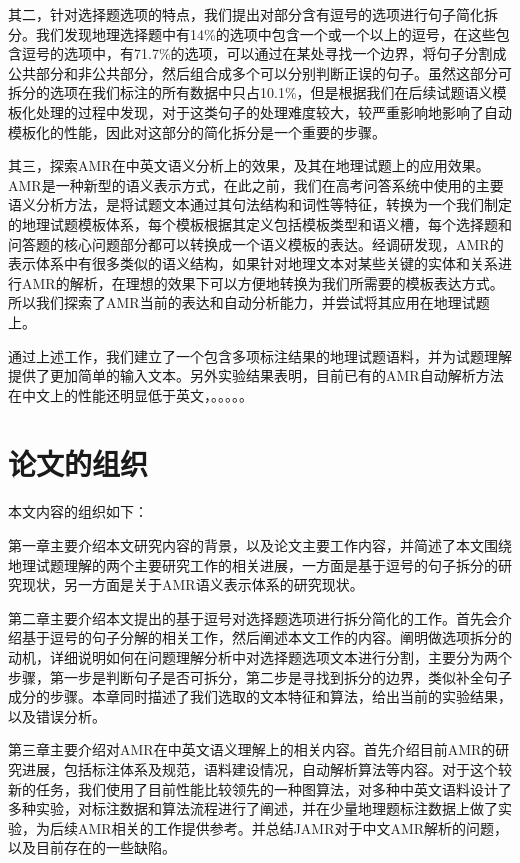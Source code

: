 \documentclass[master, winfont]{njuthesis}
\begin{document}
其二，针对选择题选项的特点，我们提出对部分含有逗号的选项进行句子简化拆分。我们发现地理选择题中有14\%的选项中包含一个或一个以上的逗号，在这些包含逗号的选项中，有71.7\%的选项，可以通过在某处寻找一个边界，将句子分割成公共部分和非公共部分，然后组合成多个可以分别判断正误的句子。虽然这部分可拆分的选项在我们标注的所有数据中只占10.1\%，但是根据我们在后续试题语义模板化处理的过程中发现，对于这类句子的处理难度较大，较严重影响地影响了自动模板化的性能，因此对这部分的简化拆分是一个重要的步骤。

其三，探索AMR在中英文语义分析上的效果，及其在地理试题上的应用效果。AMR是一种新型的语义表示方式，在此之前，我们在高考问答系统中使用的主要语义分析方法，是将试题文本通过其句法结构和词性等特征，转换为一个我们制定的地理试题模板体系，每个模板根据其定义包括模板类型和语义槽，每个选择题和问答题的核心问题部分都可以转换成一个语义模板的表达。经调研发现，AMR的表示体系中有很多类似的语义结构，如果针对地理文本对某些关键的实体和关系进行AMR的解析，在理想的效果下可以方便地转换为我们所需要的模板表达方式。所以我们探索了AMR当前的表达和自动分析能力，并尝试将其应用在地理试题上。

通过上述工作，我们建立了一个包含多项标注结果的地理试题语料，并为试题理解提供了更加简单的输入文本。另外实验结果表明，目前已有的AMR自动解析方法在中文上的性能还明显低于英文，。。。。。

\section{论文的组织}
本文内容的组织如下：

第一章主要介绍本文研究内容的背景，以及论文主要工作内容，并简述了本文围绕地理试题理解的两个主要研究工作的相关进展，一方面是基于逗号的句子拆分的研究现状，另一方面是关于AMR语义表示体系的研究现状。

第二章主要介绍本文提出的基于逗号对选择题选项进行拆分简化的工作。首先会介绍基于逗号的句子分解的相关工作，然后阐述本文工作的内容。阐明做选项拆分的动机，详细说明如何在问题理解分析中对选择题选项文本进行分割，主要分为两个步骤，第一步是判断句子是否可拆分，第二步是寻找到拆分的边界，类似补全句子成分的步骤。本章同时描述了我们选取的文本特征和算法，给出当前的实验结果，以及错误分析。

第三章主要介绍对AMR在中英文语义理解上的相关内容。首先介绍目前AMR的研究进展，包括标注体系及规范，语料建设情况，自动解析算法等内容。对于这个较新的任务，我们使用了目前性能比较领先的一种图算法，对多种中英文语料设计了多种实验，对标注数据和算法流程进行了阐述，并在少量地理题标注数据上做了实验，为后续AMR相关的工作提供参考。并总结JAMR对于中文AMR解析的问题，以及目前存在的一些缺陷。
\end{document}
